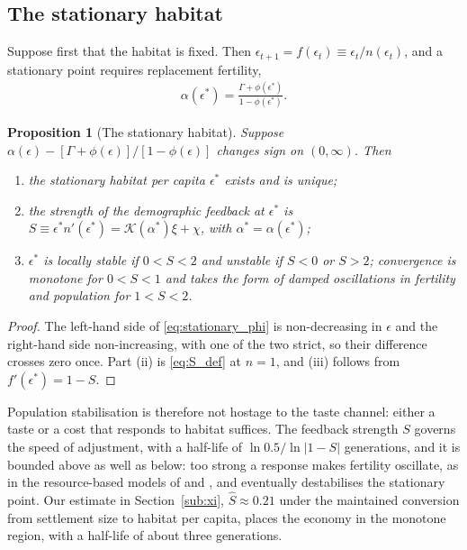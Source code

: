 \documentclass[11pt]{article}
\newtheorem{proposition}{Proposition}
\begin{document}
\subsection{The stationary habitat}
\label{sub:stationary}
Suppose first that the habitat is fixed. Then $\epsilon_{t+1}=f(\epsilon_t)\equiv\epsilon_t/n(\epsilon_t)$,
and a stationary point requires replacement fertility,
\begin{align}
\alpha(\epsilon^\ast)=\frac{\Gamma+\phi(\epsilon^\ast)}{1-\phi(\epsilon^\ast)} .
\label{eq:stationary_phi}
\end{align}

\begin{proposition}[The stationary habitat]
\label{prop:two_channels}
\label{rem:eps_stability_hab}
Suppose $\alpha(\epsilon)-[\Gamma+\phi(\epsilon)]/[1-\phi(\epsilon)]$ changes sign on $(0,\infty)$. Then
\begin{enumerate}
\item[(i)] the stationary habitat per capita $\epsilon^\ast$ exists and is unique;
\item[(ii)] the strength of the demographic feedback at $\epsilon^\ast$ is
$S\equiv\epsilon^\ast n'(\epsilon^\ast)=\mathcal{K}(\alpha^\ast)\xi+\chi$, with $\alpha^\ast=\alpha(\epsilon^\ast)$;
\item[(iii)] $\epsilon^\ast$ is locally stable if $0<S<2$ and unstable if $S<0$ or $S>2$; convergence is monotone for
$0<S<1$ and takes the form of damped oscillations in fertility and population for $1<S<2$.
\end{enumerate}
\end{proposition}

\begin{proof}
The left-hand side of \eqref{eq:stationary_phi} is non-decreasing in $\epsilon$ and the right-hand side
non-increasing, with one of the two strict, so their difference crosses zero once. Part (ii) is
\eqref{eq:S_def} at $n=1$, and (iii) follows from $f'(\epsilon^\ast)=1-S$.
\end{proof}

Population stabilisation is therefore not hostage to the taste channel: either a taste or a cost that
responds to habitat suffices. The feedback strength $S$ governs the speed of adjustment, with a
half-life of $\ln0.5/\ln|1-S|$ generations, and it is bounded above as well as below: too strong a
response makes fertility oscillate, as in the resource-based models of \citet{Brander1998} and
\citet{lagerlof2006}, and eventually destabilises the stationary point. Our estimate in
Section~\ref{sub:xi}, $\hat S\approx0.21$ under the maintained conversion from settlement size to
habitat per capita, places the economy in the monotone region, with a half-life of
about three generations.
\end{document}
